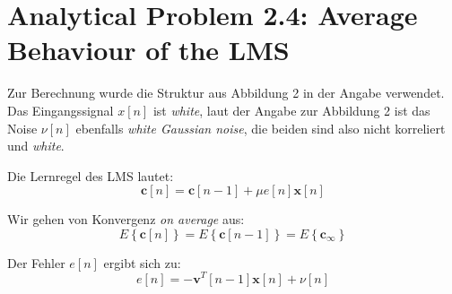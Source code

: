 \clearpage


\section{Analytical Problem 2.4: Average Behaviour of the LMS}

Zur Berechnung wurde die Struktur aus Abbildung 2 in der Angabe verwendet. Das Eingangssignal $x[n]$ ist \emph{white}, laut der Angabe zur Abbildung 2 ist das Noise $\nu[n]$ ebenfalls \emph{white Gaussian noise}, die beiden sind also nicht korreliert und \emph{white}.

Die Lernregel des LMS lautet:
\begin{equation}
  \mathbf{c}[n] = \mathbf{c}[n-1] + \mu e[n] \mathbf{x}[n]
\end{equation}

Wir gehen von Konvergenz \emph{on average} aus:
\begin{equation}
  E \left\lbrace \mathbf{c}[n] \right\rbrace = E \left\lbrace \mathbf{c}[n-1] \right\rbrace = E \left\lbrace \mathbf{c}_\infty \right\rbrace
\end{equation}

Der Fehler $e[n]$ ergibt sich zu:
\begin{equation}
  e[n] = - \mathbf{v}^T[n-1] \mathbf{x}[n] + \nu[n]
\end{equation}

